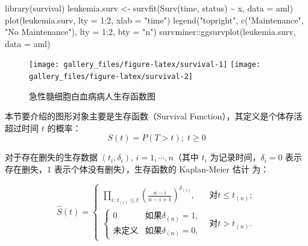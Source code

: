 \documentclass[
  b5paper,
  UTF8,twoside]{book}
\newenvironment{Shaded}{\begin{snugshade}}{\end{snugshade}}
\newcommand{\AttributeTok}[1]{\textcolor[rgb]{0.77,0.63,0.00}{#1}}
\newcommand{\DecValTok}[1]{\textcolor[rgb]{0.00,0.00,0.81}{#1}}
\newcommand{\FunctionTok}[1]{\textcolor[rgb]{0.00,0.00,0.00}{#1}}
\newcommand{\NormalTok}[1]{#1}
\newcommand{\OtherTok}[1]{\textcolor[rgb]{0.56,0.35,0.01}{#1}}
\newcommand{\SpecialCharTok}[1]{\textcolor[rgb]{0.00,0.00,0.00}{#1}}
\newcommand{\StringTok}[1]{\textcolor[rgb]{0.31,0.60,0.02}{#1}}
\begin{document}
\begin{Shaded}
\begin{Highlighting}[]
\FunctionTok{library}\NormalTok{(survival)}
\NormalTok{leukemia.surv }\OtherTok{\textless{}{-}} \FunctionTok{survfit}\NormalTok{(}\FunctionTok{Surv}\NormalTok{(time, status) }\SpecialCharTok{\textasciitilde{}}\NormalTok{ x, }\AttributeTok{data =}\NormalTok{ aml)}
\FunctionTok{plot}\NormalTok{(leukemia.surv, }\AttributeTok{lty =} \DecValTok{1}\SpecialCharTok{:}\DecValTok{2}\NormalTok{, }\AttributeTok{xlab =} \StringTok{"time"}\NormalTok{)}
\FunctionTok{legend}\NormalTok{(}\StringTok{"topright"}\NormalTok{, }\FunctionTok{c}\NormalTok{(}\StringTok{"Maintenance"}\NormalTok{, }\StringTok{"No Maintenance"}\NormalTok{), }\AttributeTok{lty =} \DecValTok{1}\SpecialCharTok{:}\DecValTok{2}\NormalTok{, }\AttributeTok{bty =} \StringTok{"n"}\NormalTok{)}
\NormalTok{survminer}\SpecialCharTok{::}\FunctionTok{ggsurvplot}\NormalTok{(leukemia.surv, }\AttributeTok{data =}\NormalTok{ aml)}
\end{Highlighting}
\end{Shaded}

\begin{figure}

{\centering \texttt{[image: gallery\_files/figure-latex/survival-1]} \texttt{[image: gallery\_files/figure-latex/survival-2]} 

}

\caption[急性髓细胞白血病病人生存函数图]{急性髓细胞白血病病人生存函数图}\label{fig:survival}
\end{figure}

本节要介绍的图形对象主要是生存函数（Survival Function），其定义是个体存活超过时间 \(t\) 的概率： \[S(t)=P(T>t);\; t\geq0\]

对于存在删失的生存数据 \((t_{i},\delta_{i}),\, i=1,\cdots,n\)（其中 \(t_{i}\) 为记录时间，\(\delta_{i}=0\) 表示存在删失，1 表示个体没有删失），生存函数的 Kaplan-Meier 估计 \citep{Kaplan58} 为：

\[\hat{S}(t)=\left\{ \begin{array}{ll}
\prod_{i:\, t_{(i)}\leq t}(\frac{n-i}{n-i+1})^{\delta_{(i)}}, & \mbox{对}t\leq t_{(n)};\\
\left\{ \begin{array}{ll}
0 & \mbox{如果}\delta_{(n)}=1,\\
\mbox{未定义} & \mbox{如果}\delta_{(n)}=0,
\end{array}\right. & \mbox{对}t>t_{(n)}.
\end{array}\right.\]
\end{document}
